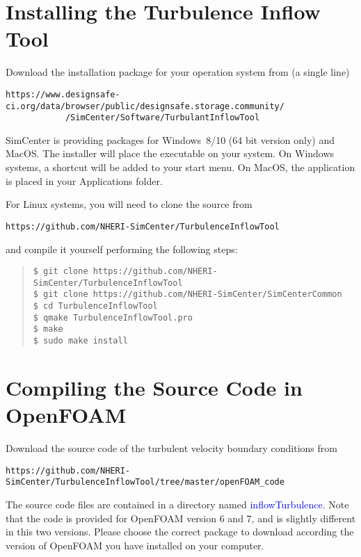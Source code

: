 \label{sec:TInF-installation}

\section{Installing the Turbulence Inflow Tool}

Download the installation package for your operation system from (a single line)
\begin{verbatim}
https://www.designsafe-ci.org/data/browser/public/designsafe.storage.community/
            /SimCenter/Software/TurbulantInflowTool
\end{verbatim}
 SimCenter is providing packages for Windows~8/10 (64 bit version only) and MacOS.  
The installer will place the executable on your system.  On Windows systems, a shortcut will be added to your start menu.
On MacOS, the application is placed in your Applications folder.
\bigskip

For Linux systems, you will need to clone the source from 
\begin{verbatim}
https://github.com/NHERI-SimCenter/TurbulenceInflowTool
\end{verbatim}
and compile it yourself performing the following steps:
\begin{quote}
\begin{verbatim}
$ git clone https://github.com/NHERI-SimCenter/TurbulenceInflowTool
$ git clone https://github.com/NHERI-SimCenter/SimCenterCommon
$ cd TurbulenceInflowTool
$ qmake TurbulenceInflowTool.pro
$ make
$ sudo make install
\end{verbatim}
\end{quote}

\section{Compiling the Source Code in OpenFOAM}

Download the source code of the turbulent velocity boundary conditions from
\begin{verbatim}
https://github.com/NHERI-SimCenter/TurbulenceInflowTool/tree/master/openFOAM_code
\end{verbatim}

\noindent  The source code files are contained in a directory named \textcolor{blue}{inflowTurbulence}. Note that the code is provided for OpenFOAM version 6 and 7, and is slightly different in this two versions. Please choose the correct package to download according the version of OpenFOAM you have installed on your computer.

